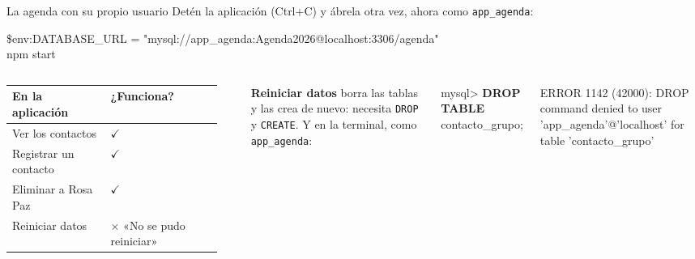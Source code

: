 \documentclass[aspectratio=169,10pt,c]{beamer}
\newcommand{\kw}[1]{\textcolor{utpRojo}{\textbf{#1}}}
\newcommand{\dentro}[1]{{\setlength{\fboxsep}{1.5pt}\colorbox{yellow!45}{#1}}}
\newcommand{\si}{$\checkmark$}
\newcommand{\no}{\textcolor{utpRojo}{$\times$}}
\newenvironment{sqlmini}[1][.86\textwidth]
  {\begin{center}\begin{lrbox}{\sqlbuf}\begin{minipage}{#1}\ttfamily\fontsize{7}{8.3}\selectfont\vspace{4pt}\raggedright}
  {\vspace{4pt}\end{minipage}\end{lrbox}\colorbox{utpGrisClaro}{\usebox{\sqlbuf}}\end{center}}
\newenvironment{sqlmicro}[1][.86\textwidth]
  {\begin{center}\begin{lrbox}{\sqlbuf}\begin{minipage}{#1}\ttfamily\fontsize{6.4}{7.5}\selectfont\vspace{4pt}\raggedright}
  {\vspace{4pt}\end{minipage}\end{lrbox}\colorbox{utpGrisClaro}{\usebox{\sqlbuf}}\end{center}}
\newcommand{\col}{\dimexpr\textwidth-2\fboxsep\relax}
\newcommand{\errlinea}[1]{{\ttfamily\scriptsize\color{utpRojo}#1}}
\begin{document}
\begin{frame}{La agenda con su propio usuario}
\small Detén la aplicación (Ctrl+C) y ábrela otra vez, ahora como \texttt{app\_agenda}:
\begin{sqlmini}[.84\textwidth]
\$env:DATABASE\_URL = "mysql://\dentro{app\_agenda:Agenda2026}@localhost:3306/agenda"\\
npm start
\end{sqlmini}
\vspace{-0.05cm}
\begin{columns}[T,onlytextwidth]
\footnotesize
\renewcommand{\arraystretch}{1.25}
\begin{tabular}{@{}ll@{}}
\toprule
\bfseries En la aplicación & \bfseries ¿Funciona? \\
\midrule
Ver los contactos & \si \\
Registrar un contacto & \si \\
Eliminar a Rosa Paz & \si \\
Reiniciar datos & \no{} «No se pudo reiniciar» \\
\bottomrule
\end{tabular}\\[6pt]
\raggedright\footnotesize \textbf{Reiniciar datos} borra las tablas y las crea de nuevo: necesita \texttt{DROP} y \texttt{CREATE}.
\small Y en la terminal, como \texttt{app\_agenda}:
\begin{sqlmicro}[\col]
mysql> \kw{DROP TABLE} contacto\_grupo;
\end{sqlmicro}
\vspace{-6pt}
{\raggedright\errlinea{ERROR 1142 (42000): DROP command denied to user 'app\_agenda'@'localhost' for table 'contacto\_grupo'}\par}
\end{columns}
\vspace{0.3cm}
\end{frame}
\end{document}
